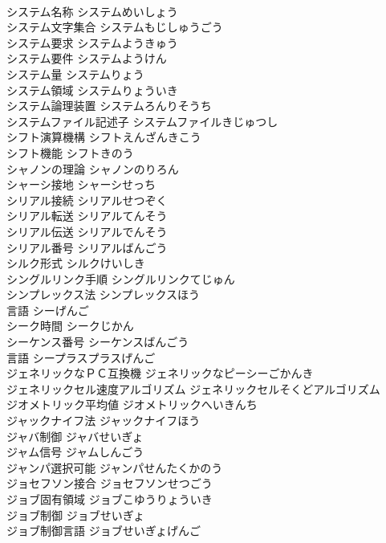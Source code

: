 \documentclass[8pt]{extreport}
\begin{document}
\begin{CJK}{UTF8}{min}
\\	システム名称	システムめいしょう	
\\	システム文字集合	システムもじしゅうごう	
\\	システム要求	システムようきゅう	
\\	システム要件	システムようけん	
\\	システム量	システムりょう	
\\	システム領域	システムりょういき	
\\	システム論理装置	システムろんりそうち	
\\	システムファイル記述子	システムファイルきじゅつし	
\\	シフト演算機構	シフトえんざんきこう	
\\	シフト機能	シフトきのう	
\\	シャノンの理論	シャノンのりろん	
\\	シャーシ接地	シャーシせっち	
\\	シリアル接続	シリアルせつぞく	
\\	シリアル転送	シリアルてんそう	
\\	シリアル伝送	シリアルでんそう	
\\	シリアル番号	シリアルばんごう	
\\	シルク形式	シルクけいしき	
\\	シングルリンク手順	シングルリンクてじゅん	
\\	シンプレックス法	シンプレックスほう	
\\	言語	シーげんご	
\\	シーク時間	シークじかん	
\\	シーケンス番号	シーケンスばんごう	
\\	言語	シープラスプラスげんご	
\\	ジェネリックなＰＣ互換機	ジェネリックなピーシーごかんき	
\\	ジェネリックセル速度アルゴリズム	ジェネリックセルそくどアルゴリズム	
\\	ジオメトリック平均値	ジオメトリックへいきんち	
\\	ジャックナイフ法	ジャックナイフほう	
\\	ジャバ制御	ジャバせいぎょ	
\\	ジャム信号	ジャムしんごう	
\\	ジャンパ選択可能	ジャンパせんたくかのう	
\\	ジョセフソン接合	ジョセフソンせつごう	
\\	ジョブ固有領域	ジョブこゆうりょういき	
\\	ジョブ制御	ジョブせいぎょ	
\\	ジョブ制御言語	ジョブせいぎょげんご	

\end{CJK}
\end{document}
